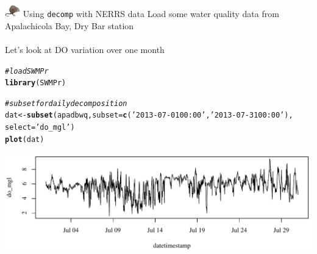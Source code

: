 \documentclass[xcolor=dvipsnames,serif]{beamer}\usepackage[]{graphicx}\usepackage[]{color}
\makeatletter
\def\maxwidth{ %
  \ifdim\Gin@nat@width>\linewidth
    \linewidth
  \else
    \Gin@nat@width
  \fi
}
\newcommand{\hlstr}[1]{\textcolor[rgb]{0.192,0.494,0.8}{#1}}%
\newcommand{\hlcom}[1]{\textcolor[rgb]{0.678,0.584,0.686}{\textit{#1}}}%
\newcommand{\hlstd}[1]{\textcolor[rgb]{0.345,0.345,0.345}{#1}}%
\newcommand{\hlkwb}[1]{\textcolor[rgb]{0.69,0.353,0.396}{#1}}%
\newcommand{\hlkwc}[1]{\textcolor[rgb]{0.333,0.667,0.333}{#1}}%
\newcommand{\hlkwd}[1]{\textcolor[rgb]{0.737,0.353,0.396}{\textbf{#1}}}%
\newenvironment{kframe}{%
 \def\at@end@of@kframe{}%
 \ifinner\ifhmode%
  \def\at@end@of@kframe{\end{minipage}}%
  \begin{minipage}{\columnwidth}%
 \fi\fi%
 \def\FrameCommand##1{\hskip\@totalleftmargin \hskip-\fboxsep
 \colorbox{shadecolor}{##1}\hskip-\fboxsep
     \hskip-\linewidth \hskip-\@totalleftmargin \hskip\columnwidth}%
 \MakeFramed {\advance\hsize-\width
   \@totalleftmargin\z@ \linewidth\hsize
   \@setminipage}}%
 {\par\unskip\endMakeFramed%
 \at@end@of@kframe}
\newenvironment{knitrout}{}{} %
\makeatother
\begin{document}
\begin{frame}[fragile]{\includegraphics[width = 0.05\textwidth]{imgs/swmprat.png} Using \texttt{decomp} with NERRS data}
Load some water quality data from Apalachicola Bay, Dry Bar station \\~\\
Let's look at DO variation over one month
\begin{knitrout}\scriptsize
{}\color{fgcolor}\begin{kframe}
\begin{alltt}
\hlcom{# load SWMPr}
\hlkwd{library}\hlstd{(SWMPr)}

\hlcom{# subset for daily decomposition}
\hlstd{dat} \hlkwb{<-} \hlkwd{subset}\hlstd{(apadbwq,} \hlkwc{subset} \hlstd{=} \hlkwd{c}\hlstd{(}\hlstr{'2013-07-01 00:00'}\hlstd{,} \hlstr{'2013-07-31 00:00'}\hlstd{),}
  \hlkwc{select} \hlstd{=} \hlstr{'do_mgl'}\hlstd{)}
\hlkwd{plot}\hlstd{(dat)}
\end{alltt}
\end{kframe}

{\centering \includegraphics[width=\maxwidth]{imgs/dailyobs-1} 

}



\end{knitrout}
\end{frame}
\end{document}
